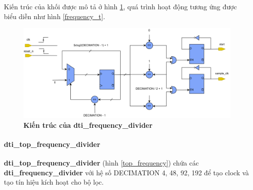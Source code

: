 Kiến trúc của khối được mô tả ở hình \ref{frequency_a}, quá trình hoạt động tương ứng được biểu diễn như hình \ref{frequency_t}.

\begin{figure}[H]
    \centering
    \includegraphics[width=14cm]{Images/Chuong4/frequency/frequency_arc.png}
    \caption[Kiến trúc của dti\_frequency\_divider]{\bfseries \fontsize{12pt}{0pt}\selectfont Kiến trúc của dti\_frequency\_divider}
    \label{frequency_a}
\end{figure}

\paragraph{dti\_top\_frequency\_divider}
\textbf{dti\_top\_frequency\_divider} (hình \ref{top_frequency}) chứa các \textbf{dti\_frequency\_divider} với hệ số DECIMATION 4, 48, 92, 192 để tạo clock và tạo tín hiệu kích hoạt cho bộ lọc.

